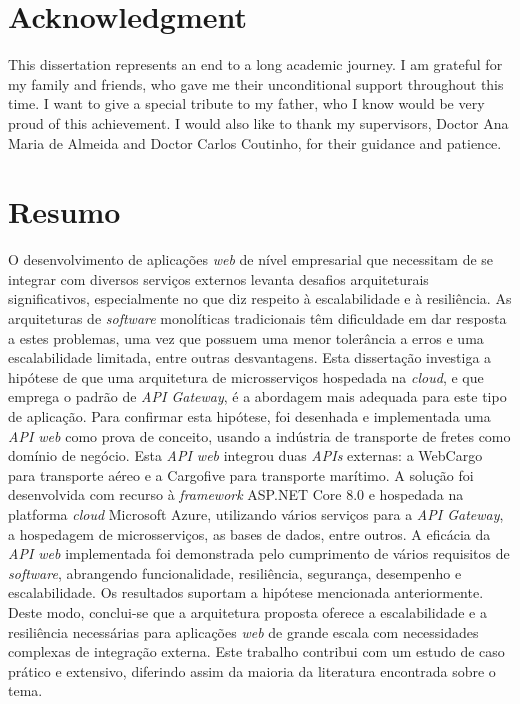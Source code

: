 \documentclass[12pt, reqno]{amsbook}
\theoremstyle{definition}
\theoremstyle{definition}
\numberwithin{section}{chapter}
\numberwithin{table}{chapter}
\numberwithin{figure}{chapter}
\begin{document}
\chapter*{Acknowledgment}

This dissertation represents an end to a long academic journey. I am grateful for my family and friends, who gave me their unconditional support throughout this time. I want to give a special tribute to my father, who I know would be very proud of this achievement. I would also like to thank my supervisors, Doctor Ana Maria de Almeida and Doctor Carlos Coutinho, for their guidance and patience.

\chapter*{Resumo}

O desenvolvimento de aplicações \textit{web} de nível empresarial que necessitam de se integrar com diversos serviços externos levanta desafios arquiteturais significativos, especialmente no que diz respeito à escalabilidade e à resiliência. As arquiteturas de \textit{software} monolíticas tradicionais têm dificuldade em dar resposta a estes problemas, uma vez que possuem uma menor tolerância a erros e uma escalabilidade limitada, entre outras desvantagens. Esta dissertação investiga a hipótese de que uma arquitetura de microsserviços hospedada na \textit{cloud}, e que emprega o padrão de \textit{API Gateway}, é a abordagem mais adequada para este tipo de aplicação. Para confirmar esta hipótese, foi desenhada e implementada uma \textit{API web} como prova de conceito, usando a indústria de transporte de fretes como domínio de negócio. Esta \textit{API web} integrou duas \textit{APIs} externas: a WebCargo para transporte aéreo e a Cargofive para transporte marítimo. A solução foi desenvolvida com recurso à \textit{framework} ASP.NET Core 8.0 e hospedada na platforma \textit{cloud} Microsoft Azure, utilizando vários serviços para a \textit{API Gateway}, a hospedagem de microsserviços, as bases de dados, entre outros. A eficácia da \textit{API web} implementada foi demonstrada pelo cumprimento de vários requisitos de \textit{software}, abrangendo funcionalidade, resiliência, segurança, desempenho e escalabilidade. Os resultados suportam a hipótese mencionada anteriormente. Deste modo, conclui-se que a arquitetura proposta oferece a escalabilidade e a resiliência necessárias para aplicações \textit{web} de grande escala com necessidades complexas de integração externa. Este trabalho contribui com um estudo de caso prático e extensivo, diferindo assim da maioria da literatura encontrada sobre o tema.
\end{document}
